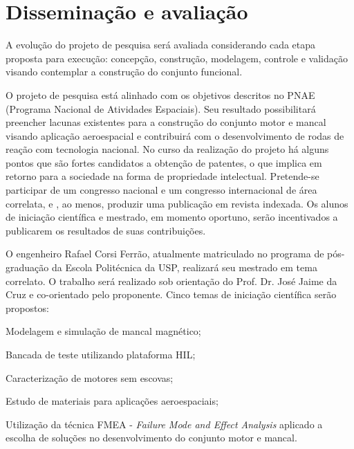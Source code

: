 

\section{Disseminação e avaliação}

A evolução do projeto de pesquisa será avaliada considerando cada etapa proposta para execução: concepção, construção, modelagem, controle e validação visando contemplar a construção do conjunto funcional.
 
O projeto de pesquisa está alinhado com os objetivos descritos no PNAE (Programa Nacional de Atividades Espaciais). Seu resultado possibilitará preencher lacunas existentes para a construção do conjunto motor e mancal visando aplicação aeroespacial e contribuirá com o desenvolvimento de rodas de reação com tecnologia nacional. No curso da realização do projeto há alguns pontos que são fortes candidatos a obtenção de patentes, o que implica em retorno para a sociedade na forma de propriedade intelectual. Pretende-se participar de um congresso nacional e um congresso internacional de área correlata, e , ao menos, produzir uma publicação em revista indexada. Os alunos de iniciação científica e mestrado, em momento oportuno, serão incentivados a publicarem os resultados de suas contribuições.
 
 O engenheiro Rafael Corsi Ferrão, atualmente matriculado no programa de pós-graduação da Escola Politécnica da USP, realizará seu mestrado em tema correlato. O trabalho será realizado sob orientação do Prof. Dr. José Jaime da Cruz e co-orientado pelo proponente. Cinco temas de iniciação científica serão propostos:

\begin{compactitem}
		\item Modelagem  e simulação de mancal magnético;
		\item Bancada de teste utilizando plataforma HIL;
		\item Caracterização de motores sem escovas;
		\item Estudo de materiais para aplicações aeroespaciais;
		\item Utilização da técnica FMEA - \textit{Failure Mode and Effect Analysis} 	aplicado a escolha de soluções no desenvolvimento do conjunto motor e mancal.
\end{compactitem}

